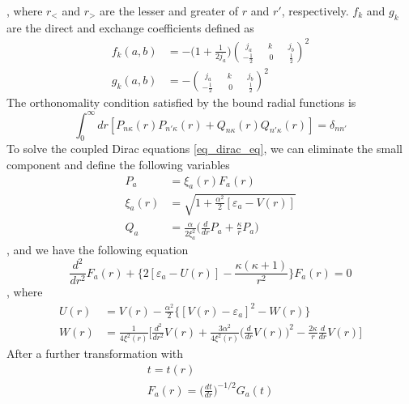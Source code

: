 , where $r_<$ and $r_>$ are the lesser and greater of $r$ and $r'$, respectively. $f_k$ and $g_k$ are the direct and exchange coefficients defined as 
\begin{equation}
	\begin{split}
		f_k(a, b) &= -
						\Bigg( 1+\frac{1}{2j_a} \Bigg)
						\binom{~~j_a \qquad k \qquad j_b}{-\frac{1}{2} \qquad 0 \qquad \frac{1}{2}} ^2  \\
		g_k(a, b) &= - \binom{~~j_a \qquad k \qquad j_b}{-\frac{1}{2} \qquad 0 \qquad \frac{1}{2}}^2
	\end{split}
\end{equation}
The orthonomality condition satisfied by the bound radial functions is 
\begin{equation} \label{eq_bound_orth}
	\int_0^\infty dr [P_{n\kappa}(r)P_{n'\kappa}(r) + Q_{n\kappa}(r)Q_{n'\kappa}(r)] = \delta_{nn'}
\end{equation}
To solve the coupled Dirac equations \ref{eq_dirac_eq}, we can eliminate the small component and define the following variables
\begin{equation}
	\begin{split}
		P_a &= \xi_a(r) F_a(r) \\
		\xi_a(r) &= \sqrt{1+\frac{\alpha^2}{2}[\varepsilon_a-V(r)]} \\
		Q_a &= \frac{\alpha}{2\xi_a^2} \Bigg( \frac{d}{dr} P_a + \frac{\kappa}{r} P_a \Bigg)
	\end{split}
\end{equation}
, and we have the following equation
\begin{equation} \label{eq_rdw_f}
	\frac{d^2}{dr^2}F_a(r) + \Bigg\{ 2[\varepsilon_a - U(r)] - \frac{\kappa (\kappa+1)}{r^2} \Bigg\}F_a(r) =0
\end{equation}
, where 
\begin{equation}
	\begin{split}
		U(r) &= V(r) - \frac{\alpha^2}{2} \Bigg \{ [V(r)-\varepsilon_a]^2 - W(r) \Bigg\} \\
		W(r) &= \frac{1}{4\xi^2(r)} \Bigg [ \frac{d^2}{dr^2}V(r) + \frac{3\alpha^2}{4\xi^2(r)}\Bigg( \frac{d}{dr} V(r)\Bigg)^2 - \frac{2\kappa}{r} \frac{d}{dr} V(r)\Bigg]
	\end{split}
\end{equation}
After a further transformation with
\begin{equation}
	\begin{split}
		t = t(r) \\
		F_a(r) = \Bigg( \frac{dt}{dr} \Bigg)^{-1/2}G_a(t)
	\end{split}
\end{equation}
